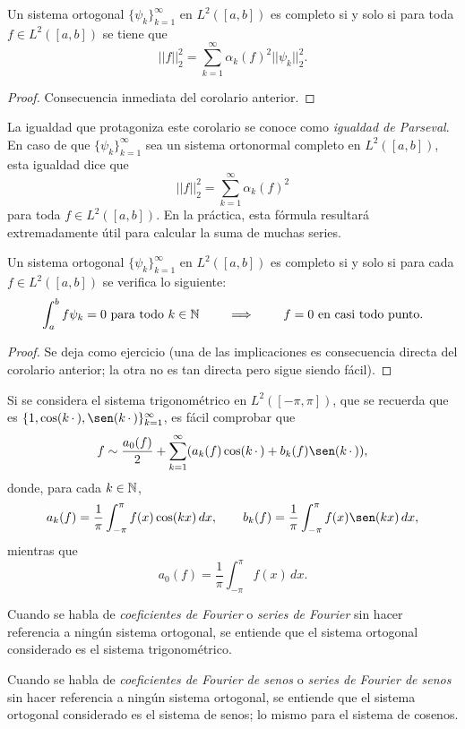\documentclass[a4paper, 12pt, extrafontsizes]{memoir}
\begin{document}
\begin{corollary}\label{cor:A.2.10}
    Un sistema ortogonal $\{\psi_k\}_{k=1}^\infty$ en $L^2([a,b])$ es completo si y solo si para toda $f \in L^2([a,b])$ se tiene que
    \[||f||_2^2 = \sum_{k=1}^\infty \alpha_k(f)^2||\psi_k||_2^2.\]
\end{corollary}

\begin{proof}
    Consecuencia inmediata del corolario anterior.
\end{proof}

La igualdad que protagoniza este corolario se conoce como \emph{igualdad de Parseval}. En caso de que $\{\psi_k\}_{k=1}^\infty$ sea un sistema ortonormal completo en $L^2([a,b])$, esta igualdad dice que
\[||f||_2^2 = \sum_{k=1}^\infty \alpha_k(f)^2\]
para toda $f \in L^2([a,b])$. En la práctica, esta fórmula resultará extremadamente útil para calcular la suma de muchas series.

\begin{corollary}
    Un sistema ortogonal $\{\psi_k\}_{k=1}^\infty$ en $L^2([a,b])$ es completo si y solo si para cada $f \in L^2([a,b])$ se verifica lo siguiente:
    \[\int_a^b f \psi_k = 0 \textup{ para todo } k \in \mathbb N \qquad \implies \qquad f = 0 \textup{ en casi todo punto.}\]
\end{corollary}

\begin{proof}
    Se deja como ejercicio (una de las implicaciones es consecuencia directa del corolario anterior; la otra no es tan directa pero sigue siendo fácil).
\end{proof}

Si se considera el sistema trigonométrico en $L^2([-\pi,\pi])$, que se recuerda que es $\{1,\cos(k\, \cdot \,),\sen(k\, \cdot \,)\}_{k=1}^\infty$, es fácil comprobar que
\[f \sim \frac{a_0(f)}{2}+\sum_{k=1}^\infty (a_k(f)\cos(k\, \cdot \,) + b_k(f)\sen(k\, \cdot \,)),\]
donde, para cada $k \in \mathbb N$,
\[a_k(f) = \frac{1}{\pi}\int_{-\pi}^\pi f(x)\cos(kx)\, dx, \qquad b_k(f) = \frac{1}{\pi}\int_{-\pi}^\pi f(x)\sen(kx) \, dx,\]
mientras que
\[a_0(f) = \frac{1}{\pi}\int_{-\pi}^\pi f(x) \, dx.\]

Cuando se habla de \emph{coeficientes de Fourier} o \emph{series de Fourier} sin hacer referencia a ningún sistema ortogonal, se entiende que el sistema ortogonal considerado es el sistema trigonométrico.

Cuando se habla de \emph{coeficientes de Fourier de senos} o \emph{series de Fourier de senos} sin hacer referencia a ningún sistema ortogonal, se entiende que el sistema ortogonal considerado es el sistema de senos; lo mismo para el sistema de cosenos.
\end{document}
